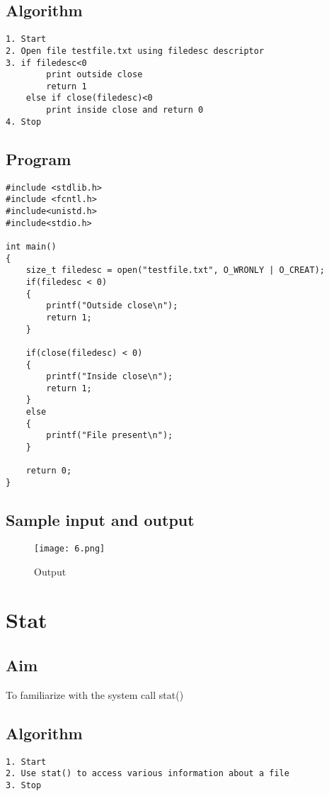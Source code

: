 \documentclass{article}
\begin{document}
\subsection{Algorithm}
\begin{Verbatim}[tabsize = 4]
1. Start
2. Open file testfile.txt using filedesc descriptor
3. if filedesc<0
        print outside close
        return 1
    else if close(filedesc)<0
        print inside close and return 0
4. Stop
\end{Verbatim}
\subsection{Program}
\begin{Verbatim}[tabsize = 4]
#include <stdlib.h>
#include <fcntl.h>
#include<unistd.h>
#include<stdio.h>
 
int main()
{
    size_t filedesc = open("testfile.txt", O_WRONLY | O_CREAT);
    if(filedesc < 0)
    {
    	printf("Outside close\n");
        return 1;
    }
 
    if(close(filedesc) < 0)
    {
    	printf("Inside close\n");
        return 1;
    }
    else
    {
    	printf("File present\n");
    }
 
    return 0;
}

\end{Verbatim}
\thispagestyle{third}
\subsection{Sample input and output}
\begin{figure}[H]
    \centering
    \texttt{[image: 6.png]}
    \caption{Output}
    \label{fig:my_label2}
\end{figure}
\section{\Large Stat}
\subsection{Aim}
To familiarize with the system call stat()
\subsection{Algorithm}
\begin{Verbatim}[tabsize = 4]
1. Start
2. Use stat() to access various information about a file
3. Stop
\end{Verbatim}
\end{document}
